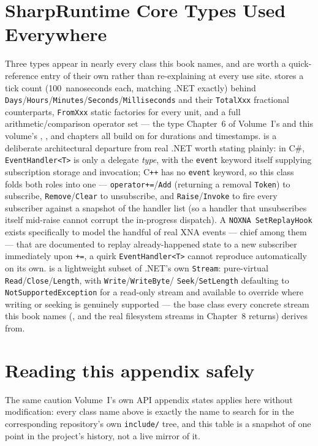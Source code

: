 \section{SharpRuntime Core Types Used Everywhere}
\label{sec:api-sharpruntime-core}

Three  types appear in nearly every class this book names, and are worth
a quick-reference entry of their own rather than re-explaining at every use site.
 stores a tick count (100~nanoseconds each, matching .NET exactly)
behind \texttt{Days}/\texttt{Hours}/\texttt{Minutes}/\texttt{Seconds}/\texttt{Milliseconds} and
their \texttt{TotalXxx} fractional counterparts, \texttt{FromXxx} static factories for every
unit, and a full arithmetic/comparison operator set --- the type Chapter~6 of Volume~I's
 and this volume's , , and
 chapters all build on for durations and timestamps.
 is a deliberate architectural departure from real
\uppercase{.}NET worth stating plainly: in C\#, \texttt{EventHandler<T>} is only a delegate
\emph{type}, with the \texttt{event} keyword itself supplying subscription storage and
invocation; C\texttt{++} has no \texttt{event} keyword, so this class folds both roles into one
--- \texttt{operator+=}/\texttt{Add} (returning a removal \texttt{Token}) to subscribe,
\texttt{Remove}/\texttt{Clear} to unsubscribe, and \texttt{Raise}/\texttt{Invoke} to fire every
subscriber against a snapshot of the handler list (so a handler that unsubscribes itself
mid-raise cannot corrupt the in-progress dispatch). A \texttt{NOXNA SetReplayHook} exists
specifically to model the handful of real XNA events --- 
chief among them --- that are documented to replay already-happened state to a new subscriber
immediately upon \texttt{+=}, a quirk \texttt{EventHandler<T>} cannot reproduce automatically on
its own.  is a lightweight subset of .NET's own \texttt{Stream}:
pure-virtual \texttt{Read}/\texttt{Close}/\texttt{Length}, with \texttt{Write}/\texttt{WriteByte}/%
\texttt{Seek}/\texttt{SetLength} defaulting to \texttt{NotSupportedException} for a read-only
stream and available to override where writing or seeking is genuinely supported --- the base
class every concrete stream this book names (, and the real filesystem
streams  in Chapter~8 returns) derives from.

\section{Reading this appendix safely}

The same caution Volume~I's own API appendix states applies here without modification: every
class name above is exactly the name to search for in the corresponding repository's own
\texttt{include/} tree, and this table is a snapshot of one point in the project's history, not
a live mirror of it.
